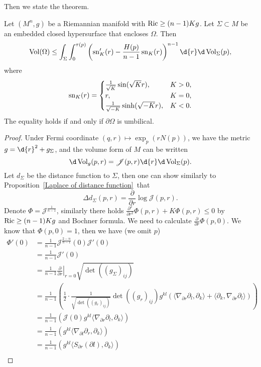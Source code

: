 Then we state the theorem.
\begin{thm}
    Let $(M^n,g)$ be a Riemannian manifold with $\operatorname{Ric}\geq(n-1)Kg$.
    Let $\Sigma\subset M$ be an embedded closed hypersurface that encloses $\Omega$.
    Then
    \[\Vol(\Omega)\leq\int_\Sigma\int_0^{\tau(p)}\left(\sn'_K(r)-\frac{H(p)}{n-1}\sn_K(r)\right)^{n-1}\d{r}\d\Vol_{\Sigma}(p),\]
    where
    \[\operatorname{sn}_K(r)=\begin{cases}
        \frac{1}{\sqrt{K}}\sin(\sqrt{K}r), & K>0,\\
        r, & K=0,\\
        \frac{1}{\sqrt{-K}}\sinh(\sqrt{-K}r), & K<0.
    \end{cases}\]
    The equality holds if and only if $\partial\Omega$ is umbilical.
\end{thm}
\begin{proof}
    Under Fermi coordinate $(q,r)\mapsto\exp_p(rN(p))$, we have the metric $g=\d{r}^2+g_{\Sigma}$, and the volume form of $M$ can be written
    \[\d\Vol_g(p,r)=\mathscr{J}(p,r)\d{r}\d\Vol_{\Sigma}(p).\]
    Let $d_\Sigma$ be the distance function to $\Sigma$, then one can show similarly to Proposition~\ref{Laplace of distance function}~that
    \[\Delta d_\Sigma(p,r)=\frac{\partial{}}{\partial{r}}\log\mathscr{J}(p,r).\]
    Denote $\Phi=\mathscr{J}^{\frac{1}{n-1}}$, similarly there holds $\frac{\partial^2{}}{\partial{r^2}}\Phi(p,r)+K\Phi(p,r)\leq 0$ by $\operatorname{Ric}\geq(n-1)Kg$ and Bochner formula.
    We need to calculate $\frac{\partial{}}{\partial{r}}\Phi(p,0)$.
    We know that $\Phi(p,0)=1$, then we have (we omit $p$)
    \begin{align*}
        \Phi'(0)&=\frac{1}{n-1}\mathscr{J}^{\frac{2-n}{n-1}}(0)\mathscr{J}'(0)\\
        &=\frac{1}{n-1}\mathscr{J}'(0)\\
        &=\frac{1}{n-1}\left.\frac{\partial{}}{\partial{r}}\right|_{r=0}\sqrt{\det((g_\Sigma)_{ij})}\\
        &=\frac{1}{n-1}\left(\frac{1}{2}\cdot\frac{1}{\sqrt{\det((g_r)_{ij})}}\det((g_r)_{ij})g^{kl}(\langle\nabla_{\partial r}\partial_l,\partial_k\rangle+\langle\partial_k,\nabla_{\partial r}\partial_l\rangle)\right)\\
        &=\frac{1}{n-1}\left(\mathscr{J}(0)g^{kl}\langle\nabla_{\partial r}\partial_l,\partial_k\rangle\right)\\
        &=\frac{1}{n-1}\left(g^{kl}\langle\nabla_{\partial l}\partial_r,\partial_k\rangle\right)\\
        &=\frac{1}{n-1}\left(g^{kl}\langle S_{\partial r}(\partial l),\partial_k\rangle\right)\\

\end{align*}
\end{proof}
